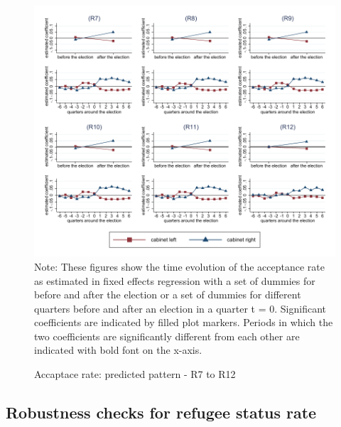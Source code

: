 \documentclass[11pt,a4paper]{scrartcl}
\begin{document}
\clearpage
\FloatBarrier
\begin{figure}[!ht]
	\caption{Accaptace rate: predicted pattern - R7 to R12}
	\includegraphics[width=1\textwidth]{../results/decisions/acceptance_rate_graphs_R7-R12.pdf}
	\scriptsize{Note: These figures show the time evolution of the acceptance rate as estimated in fixed effects regression with a set of dummies for before and after the election or a set of dummies for different quarters before and after an election in a quarter t = 0. Significant coefficients are indicated by filled plot markers. Periods in which the two coefficients are significantly different from each other are indicated with bold font on the x-axis.}
\end{figure}

\clearpage
\FloatBarrier



\clearpage
\FloatBarrier



\clearpage
\FloatBarrier





\clearpage
\FloatBarrier
\subsection{Robustness checks for refugee status rate}
\end{document}
